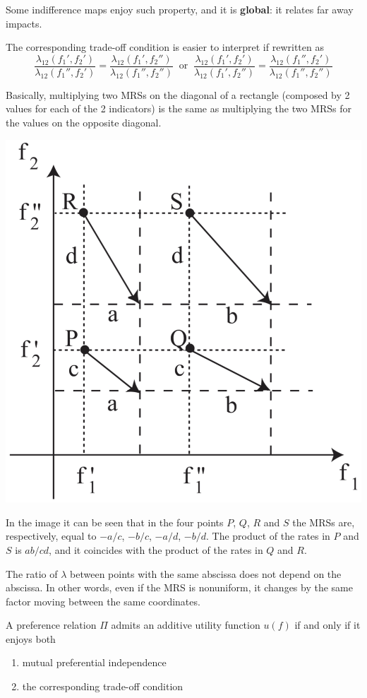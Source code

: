 Some indifference maps enjoy such property, and it is \textbf{global}: it relates far away impacts.

The corresponding trade-off condition is easier to interpret if rewritten as
$$ 
\frac{\lambda_{12} (f_1', f_2')}{\lambda_{12} (f_1'', f_2')} = \frac{\lambda_{12} (f_1', f_2'')}{\lambda_{12} (f_1'', f_2'')}
\ \text{ or } \
\frac{\lambda_{12} (f_1', f_2')}{\lambda_{12} (f_1', f_2'')} = \frac{\lambda_{12} (f_1'', f_2')}{\lambda_{12} (f_1'', f_2'')}
$$

Basically, multiplying two MRSs on the diagonal of a rectangle (composed by 2 values for each of the 2 indicators) is the same as multiplying the two MRSs for the values on the opposite diagonal.

\begin{center}
	\includegraphics[width=0.45\columnwidth]{img/bdm/structpref/mrs1}
\end{center}
In the image it can be seen that in the four points $P$, $Q$, $R$ and $S$ the MRSs are, respectively, equal to $-a/c$, $-b/c$, $-a/d$, $-b/d$. The product of the rates in $P$ and $S$ is $ab/cd$, and it coincides with the product of the rates in $Q$ and $R$.

The ratio of $\lambda$ between points with the same abscissa does not depend on the abscissa. In other words, even if the MRS is nonuniform, it changes by the same factor moving between the same coordinates. \\

\begin{theo}
	A preference relation $\Pi$ admits an additive utility function $u(f)$ if and only if it enjoys both
	\begin{enumerate}
		\item mutual preferential independence
		
		\item the corresponding trade-off condition
	\end{enumerate}
\end{theo}

